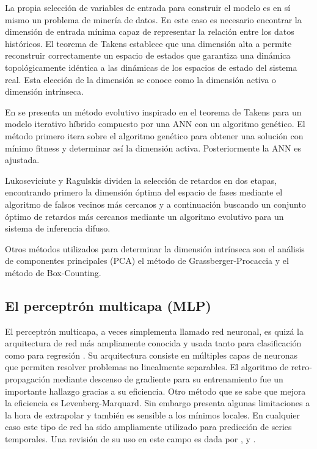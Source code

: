 \documentclass{llncs}
\begin{document}
La propia selección de variables de entrada para construir el modelo es en sí mismo un problema de minería de datos. En este caso es necesario encontrar la dimensión de entrada mínima capaz de representar la relación entre los datos históricos. El teorema de Takens \cite{Takens1981366} establece que una dimensión alta a permite reconstruir correctamente un espacio de estados que garantiza una dinámica topológicamente idéntica a las dinámicas de los espacios de estado del sistema real. Esta elección de la dimensión se conoce como la dimensión activa o dimensión intrínseca.

En \cite{ferreira2008new} se presenta un método evolutivo inspirado en el teorema de Takens para un modelo iterativo híbrido compuesto por una ANN con un algoritmo genético. El método primero itera sobre el algoritmo genético para obtener una solución con mínimo fitness y determinar así la dimensión activa. Posteriormente la ANN es ajustada. 

Lukoseviciute y Ragulskis \cite{lukoseviciute2010evolutionary} dividen la selección de retardos en dos etapas, encontrando primero la dimensión óptima del espacio de fases mediante el algoritmo de falsos vecinos más cercanos y a continuación buscando un conjunto óptimo de retardos más cercanos mediante un algoritmo evolutivo para un sistema de inferencia difuso.

Otros métodos utilizados para determinar la dimensión intrínseca son el análisis de componentes principales (PCA) el método de Grassberger-Procaccia \cite{grassberger2004measuring} y  el método de Box-Counting. 


\subsection{El perceptrón multicapa (MLP)}

El perceptrón multicapa, a veces simplementa llamado red neuronal, es quizá la arquitectura de red más ampliamente conocida y usada tanto para clasificación como para regresión \cite{bishop1995neural}. Su arquitectura consiste en múltiples capas de neuronas que permiten resolver problemas no linealmente separables. El algoritmo de retro-propagación mediante descenso de gradiente para su entrenamiento fue un importante hallazgo gracias a su eficiencia. Otro método que se sabe que mejora la eficiencia es Levenberg-Marquard. Sin embargo presenta algunas limitaciones a la hora de extrapolar y también es sensible a los mínimos locales. En cualquier caso este tipo de red ha sido ampliamente utilizado para predicción de series temporales. Una revisión de su uso en este campo es dada por \cite{hippert2001neural}, \cite{azoff1994neural} y \cite{hoptroff1993principles}.
\end{document}
